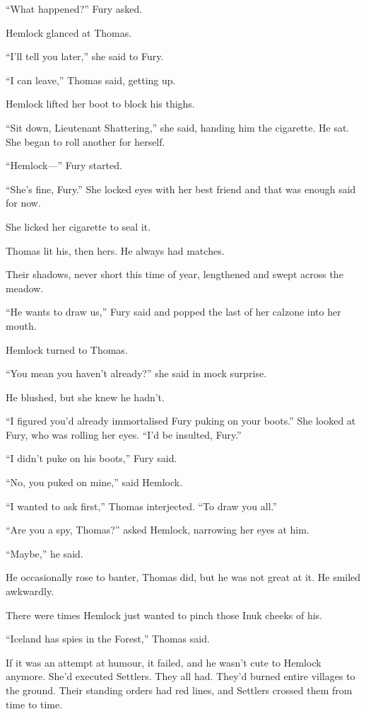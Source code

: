 \documentclass[11pt,a5paper]{article}
\begin{document}
``What happened?'' Fury asked.

Hemlock glanced at Thomas.

``I'll tell you later,'' she said to Fury.

``I can leave,'' Thomas said, getting up.

Hemlock lifted her boot to block his thighs.

``Sit down, Lieutenant Shattering,'' she said, handing him the cigarette. He sat. She began to roll another for herself.

``Hemlock---'' Fury started.

``She's fine, Fury.'' She locked eyes with her best friend and that was enough said for now.

She licked her cigarette to seal it.

Thomas lit his, then hers. He always had matches.

Their shadows, never short this time of year, lengthened and swept across the meadow.

``He wants to draw us,'' Fury said and popped the last of her calzone into her mouth.

Hemlock turned to Thomas.

``You mean you haven't already?'' she said in mock surprise.

He blushed, but she knew he hadn't.

``I figured you'd already immortalised Fury puking on your boots.'' She looked at Fury, who was rolling her eyes. ``I'd be insulted, Fury.''

``I didn't puke on his boots,'' Fury said.

``No, you puked on mine,'' said Hemlock.

``I wanted to ask first,'' Thomas interjected. ``To draw you all.''

``Are you a spy, Thomas?'' asked Hemlock, narrowing her eyes at him.

``Maybe,'' he said.

He occasionally rose to banter, Thomas did, but he was not great at it. He smiled awkwardly.

There were times Hemlock just wanted to pinch those Inuk cheeks of his.

``Iceland has spies in the Forest,'' Thomas said.

If it was an attempt at humour, it failed, and he wasn't cute to Hemlock anymore. She'd executed Settlers. They all had. They'd burned entire villages to the ground. Their standing orders had red lines, and Settlers crossed them from time to time.
\end{document}
